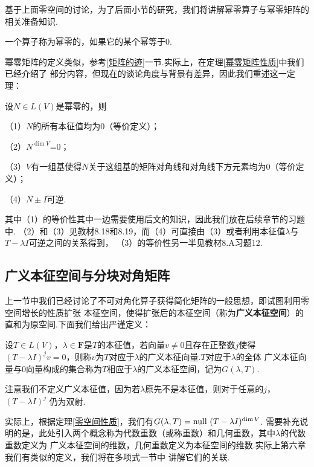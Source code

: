 基于上面零空间的讨论，为了后面小节的研究，我们将讲解幂零算子与幂零矩阵的相关准备知识.
\begin{definition}
	一个算子称为幂零的，如果它的某个幂等于$0$.
\end{definition}
幂零矩阵的定义类似，参考\ref{矩阵的迹}一节.实际上，在定理\ref{幂零矩阵性质}中我们已经介绍了
部分内容，但现在的谈论角度与背景有差异，因此我们重述这一定理：
\begin{theorem}\label{幂零算子性质}
	设$N\in L(V)$是幂零的，则

	\textup{（1）}$N$的所有本征值均为$0$（等价定义）；

	\textup{（2）}$N^{\dim V}$=$0$；

	\textup{（3）}$V$有一组基使得$N$关于这组基的矩阵对角线和对角线下方元素均为$0$（等价定义）；

	\textup{（4）}$N\pm I$可逆.
\end{theorem}
其中（1）的等价性其中一边需要使用后文的知识，因此我们放在后续章节的习题中.
（2）和（3）见教材8.18和8.19，而（4）可直接由（3）或者利用本征值$\lambda$与$T-\lambda I$可逆之间的关系得到，
（3）的等价性另一半见教材8.A习题12.

\subsection{广义本征空间与分块对角矩阵}
上一节中我们已经讨论了不可对角化算子获得简化矩阵的一般思想，即试图利用零空间增长的性质扩张
本征空间，使得扩张后的本征空间（称为\textbf{广义本征空间}）的直和为原空间.下面我们给出严谨定义：
\begin{definition}
	设$T\in L(V)$，$\lambda\in\mathbf{F}$是$T$的本征值，若向量$v\neq 0$且存在正整数$j$使得
	$(T-\lambda I)^jv=0$，则称$v$为$T$对应于$\lambda$的广义本征向量.$T$对应于$\lambda$的全体
	广义本征向量与$0$向量构成的集合称为$T$相应于$\lambda$的广义本征空间，记为$G(\lambda,T)$.
\end{definition}
注意我们不定义广义本征值，因为若$\lambda$原先不是本征值，则对于任意的$j$，$(T-\lambda I)^j$
仍为双射.

实际上，根据定理\ref{零空间性质}，我们有$G(\lambda,T)=\textup{null }(T-\lambda I)^{\dim V}$.
需要补充说明的是，此处引入两个概念称为代数重数（或称重数）和几何重数，其中$\lambda$的代数重数定义为
广义本征空间的维数，几何重数定义为本征空间的维数.实际上第六章我们有类似的定义，我们将在多项式一节中
讲解它们的关联.

